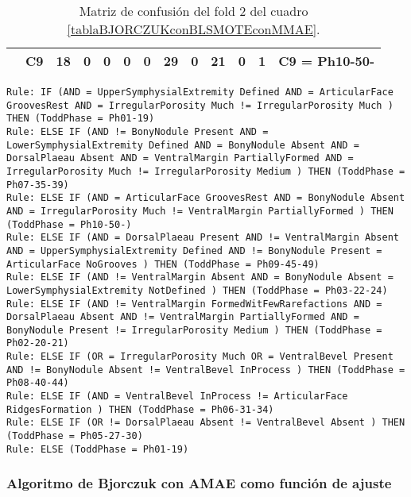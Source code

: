 \begin{table}[H]
{\begin{tabular}{|ccrrrrrrrrrrc|}
\multicolumn{1}{|c|}{}                                      & \multicolumn{1}{c|}{C9} & \multicolumn{1}{c|}{\textbf{18}} & \multicolumn{1}{c|}{0}  & \multicolumn{1}{c|}{0}  & \multicolumn{1}{c|}{0}  & \multicolumn{1}{c|}{0}  & \multicolumn{1}{c|}{\textbf{29}} & \multicolumn{1}{c|}{0}  & \multicolumn{1}{c|}{\textbf{21}} & \multicolumn{1}{c|}{0}  & \multicolumn{1}{c|}{\textbf{1}}  & C9 = Ph10-50-     \\ \hline
\end{tabular}%
}
\caption{Matriz de confusión del fold 2 del cuadro \ref{tablaBJORCZUKconBLSMOTEconMMAE}.}
\end{table}

\begin{lstlisting}
Rule: IF (AND = UpperSymphysialExtremity Defined AND = ArticularFace GroovesRest AND = IrregularPorosity Much != IrregularPorosity Much ) THEN (ToddPhase = Ph01-19)
Rule: ELSE IF (AND != BonyNodule Present AND = LowerSymphysialExtremity Defined AND = BonyNodule Absent AND = DorsalPlaeau Absent AND = VentralMargin PartiallyFormed AND = IrregularPorosity Much != IrregularPorosity Medium ) THEN (ToddPhase = Ph07-35-39)
Rule: ELSE IF (AND = ArticularFace GroovesRest AND = BonyNodule Absent AND = IrregularPorosity Much != VentralMargin PartiallyFormed ) THEN (ToddPhase = Ph10-50-)
Rule: ELSE IF (AND = DorsalPlaeau Present AND != VentralMargin Absent AND = UpperSymphysialExtremity Defined AND != BonyNodule Present = ArticularFace NoGrooves ) THEN (ToddPhase = Ph09-45-49)
Rule: ELSE IF (AND != VentralMargin Absent AND = BonyNodule Absent = LowerSymphysialExtremity NotDefined ) THEN (ToddPhase = Ph03-22-24)
Rule: ELSE IF (AND != VentralMargin FormedWitFewRarefactions AND = DorsalPlaeau Absent AND != VentralMargin PartiallyFormed AND = BonyNodule Present != IrregularPorosity Medium ) THEN (ToddPhase = Ph02-20-21)
Rule: ELSE IF (OR = IrregularPorosity Much OR = VentralBevel Present AND != BonyNodule Absent != VentralBevel InProcess ) THEN (ToddPhase = Ph08-40-44)
Rule: ELSE IF (AND = VentralBevel InProcess != ArticularFace RidgesFormation ) THEN (ToddPhase = Ph06-31-34)
Rule: ELSE IF (OR != DorsalPlaeau Absent != VentralBevel Absent ) THEN (ToddPhase = Ph05-27-30)
Rule: ELSE (ToddPhase = Ph01-19)
\end{lstlisting}


\subsubsection{Algoritmo de Bjorczuk con AMAE como función de ajuste}

